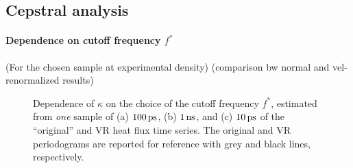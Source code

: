 \subsection{Cepstral analysis}
\paragraph{Dependence on cutoff frequency $f^*$}
(For the chosen sample at experimental density)
(comparison bw normal and vel-renormalized results)

\begin{figure}
    \centering
    \caption{Dependence of $\kappa$ on the choice of the cutoff frequency $f^*$, estimated from \emph{one} sample of (a) $100\,\mathrm{ps}$, (b) $1\,\mathrm{ns}$, and (c) $10\,\mathrm{ps}$ of the ``original'' and VR heat flux time series. 
    The original and VR periodograms are reported for reference with grey and black lines, respectively.}
    \label{fig:csilica-sample-expdens-fstar}
\end{figure}
